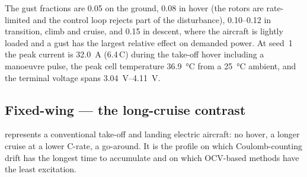 The gust fractions are \num{0.05} on the ground, \num{0.08} in hover (the rotors are rate-limited
and the control loop rejects part of the disturbance), \numrange{0.10}{0.12} in transition, climb and
cruise, and \num{0.15} in descent, where the aircraft is lightly loaded and a gust has the largest
relative effect on demanded power. At seed~1 the peak current is \SI{32.0}{\ampere} (6.4\,C) during
the take-off hover including a manoeuvre pulse, the peak cell temperature \SI{36.9}{\celsius} from a
\SI{25}{\celsius} ambient, and the terminal voltage spans \SIrange{3.04}{4.11}{\volt}.


\subsection{Fixed-wing --- the long-cruise contrast}

 represents a conventional take-off and landing electric aircraft: no hover, a
longer cruise at a lower C-rate, a go-around. It is the profile on which Coulomb-counting drift has
the longest time to accumulate and on which OCV-based methods have the least excitation.

